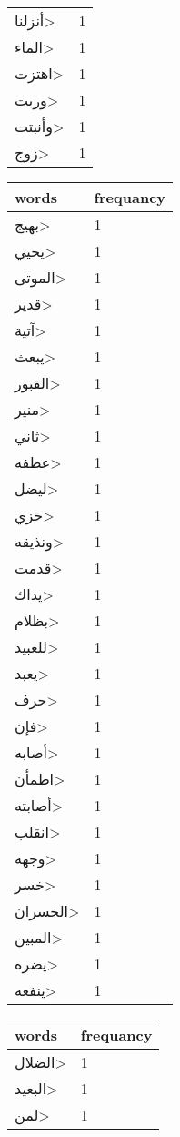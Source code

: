 \documentclass{article}
\begin{document}
\begin{multicols}{3}
\begin{center}
\begin{tabular}{ P{2cm}  P{1cm}}
\<أنزلنا> & 1 \\ 
\<الماء> & 1 \\ 
\<اهتزت> & 1 \\ 
\<وربت> & 1 \\ 
\<وأنبتت> & 1 \\ 
\<زوج> & 1 \\ 
\end{tabular} 
\begin{tabular}{ P{2cm}  P{1cm}} 
\textbf{words}    & \textbf{frequancy}  \\
\hline
\<بهيج> & 1 \\ 
\<يحيي> & 1 \\ 
\<الموتى> & 1 \\ 
\<قدير> & 1 \\ 
\<آتية> & 1 \\ 
\<يبعث> & 1 \\ 
\<القبور> & 1 \\ 
\<منير> & 1 \\ 
\<ثاني> & 1 \\ 
\<عطفه> & 1 \\ 
\<ليضل> & 1 \\ 
\<خزي> & 1 \\ 
\<ونذيقه> & 1 \\ 
\<قدمت> & 1 \\ 
\<يداك> & 1 \\ 
\<بظلام> & 1 \\ 
\<للعبيد> & 1 \\ 
\<يعبد> & 1 \\ 
\<حرف> & 1 \\ 
\<فإن> & 1 \\ 
\<أصابه> & 1 \\ 
\<اطمأن> & 1 \\ 
\<أصابته> & 1 \\ 
\<انقلب> & 1 \\ 
\<وجهه> & 1 \\ 
\<خسر> & 1 \\ 
\<الخسران> & 1 \\ 
\<المبين> & 1 \\ 
\<يضره> & 1 \\ 
\<ينفعه> & 1 \\ 
\end{tabular} 
\begin{tabular}{ P{2cm}  P{1cm}} 
\textbf{words}    & \textbf{frequancy}  \\
\hline
\<الضلال> & 1 \\ 
\<البعيد> & 1 \\ 
\<لمن> & 1 \\ 

\end{tabular}
\end{center}
\end{multicols}
\end{document}
